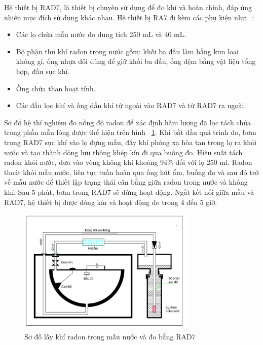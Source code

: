 Hệ thiết bị  RAD7,  là thiết bị chuyên sử dụng để đo khí  và  hoàn chỉnh, đáp ứng nhiều mục đích sử dụng khác nhau. Hệ thiết bị RA7 đi kèm các phụ kiện như ~\cite{Thesis:HNPThu}: 
    \begin{itemize}
        \item Các lọ chứa    mẫu nước đo dung tích 250 mL và 40 mL.
        \item Bộ phận thu khí radon trong nước gồm: khối ba đầu làm bằng kim loại
        không gỉ, ống nhựa đôi dùng để giữ khối ba đầu, ống đệm bằng vật liệu tổng hợp, đầu sục khí.
        \item Ống chứa than hoạt tính.
        \item Các đầu lọc khí và ống dẫn khí từ ngoài vào RAD7 và từ RAD7 ra ngoài.
    \end{itemize} 
    


    Sơ đồ hệ thí nghiệm đo nồng độ radon để xác định hàm lượng  đã lọc tách chứa trong phần mẫu lỏng  được thể hiện trên hình ~\ref{figure:SoDoLayRnRD7}. Khi bắt đầu quá trình đo, bơm trong RAD7 sục khí vào lọ đựng mẫu, đẩy khí phóng xạ hòa tan trong lọ ra khỏi nước và tạo thành dòng lưu thông khép kín đi qua buồng đo. Hiệu suất tách radon khỏi nước, đưa vào vòng không khí khoảng 94\% đối với lọ 250 ml. Radon thoát khỏi mẫu nước, liên tục tuần hoàn qua ống hút ẩm, buồng đo và sau đó trở về mẫu nước để thiết lập trạng thái cân bằng giữa radon trong nước và không khí. Sau 5 phút, bơm trong RAD7 sẽ dừng hoạt động. Ngắt kết nối giữa mẫu và RAD7, hệ thiết bị được đóng kín và hoạt động đo trong 4 đến 5 giờ. 


    
    \begin{figure}[htbp]
        \centering
        \includegraphics[width=0.75\textwidth]{Image/MnO2-Figure7.png}
        \caption{Sơ đồ lấy khí radon trong mẫu nước và đo bằng RAD7}
        \label{figure:SoDoLayRnRD7}
    \end{figure}



